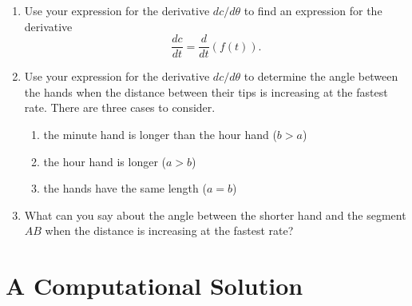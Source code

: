 \documentclass{ximera}
\begin{document}
\begin{question}
\begin{enumerate}
\item Use your expression for the derivative $dc/d\theta$ to find an expression for the derivative
\[
     \frac{dc}{dt} = \frac{d}{d t}\left(f(t) \right) .
\]

\item Use your expression for the derivative $dc/d\theta$ to determine the angle between the hands when the distance between their tips is increasing at the fastest rate. There are three cases to consider.

\begin{enumerate}
\item the minute hand is longer than the hour hand ($b>a$)

\item the hour hand is longer ($a>b$)

\item the hands have the same length ($a=b$)
\end{enumerate}

\item What can you say about the angle between the shorter hand and the segment $AB$ when the distance is increasing at the fastest rate? 

\end{enumerate}

\end{question}

\section*{A Computational Solution}
\end{document}
